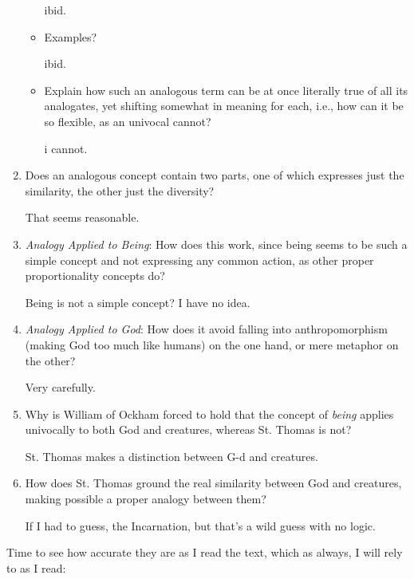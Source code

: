 \documentclass[12pt]{article}[titlepage]
\newcommand{\1}{\={a}}
\newcommand{\2}{\={e}}
\newcommand{\3}{\={\i}}
\newcommand{\4}{\=o}
\newcommand{\5}{\=u}
\newcommand{\6}{\={A}}
\renewcommand{\,}{\textsuperscript{,}}
\begin{document}
\begin{enumerate}
\begin{itemize}
ibid.
\item Examples?

ibid.
\item Explain how such an analogous term can be at once literally true of all its analogates, yet shifting somewhat in meaning for each, i.e., how can it be so flexible, as an univocal cannot?

i cannot.
\end{itemize}
\item Does an analogous concept contain two parts, one of which expresses just the similarity, the other just the diversity?

That seems reasonable.
\item \emph{Analogy Applied to Being}: How does this work, since being seems to be such a simple concept and not expressing any common action, as other proper proportionality concepts do?

Being is not a simple concept?
I have no idea.
\item \emph{Analogy Applied to God}: How does it avoid falling into anthropomorphism (making God too much like humans) on the one hand, or mere metaphor on the other?

Very carefully.
\item Why is William of Ockham forced to hold that the concept of \emph{being} applies univocally to both God and creatures, whereas St. Thomas is not?

St. Thomas makes a distinction between G-d and creatures.
\item How does St. Thomas ground the real similarity between God and creatures, making possible a proper analogy between them?

If I had to guess, the Incarnation, but that's a wild guess with no logic.
\end{enumerate}

Time to see how accurate they are as I read the text, which as always, I will rely to as I read:
\end{document}
